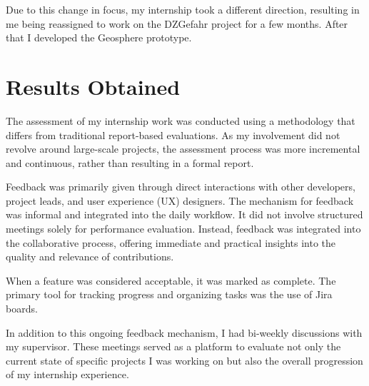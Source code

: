 \documentclass[11pt, titlepage, a4paper]{article}
\begin{document}
Due to this change in focus, my internship took a different direction, resulting in me being reassigned to work on the DZGefahr project for a few months. After that I developed the Geosphere prototype.


\section{Results Obtained}
The assessment of my internship work was conducted using a methodology that differs from traditional report-based evaluations. As my involvement did not revolve around large-scale projects, the assessment process was more incremental and continuous, rather than resulting in a formal report.

Feedback was primarily given through direct interactions with other developers, project leads, and user experience (UX) designers. The mechanism for feedback was informal and integrated into the daily workflow. It did not involve structured meetings solely for performance evaluation. Instead, feedback was integrated into the collaborative process, offering immediate and practical insights into the quality and relevance of contributions.

When a feature was considered acceptable, it was marked as complete. The primary tool for tracking progress and organizing tasks was the use of Jira boards.

In addition to this ongoing feedback mechanism, I had bi-weekly discussions with my supervisor. These meetings served as a platform to evaluate not only the current state of specific projects I was working on but also the overall progression of my internship experience.
\end{document}
